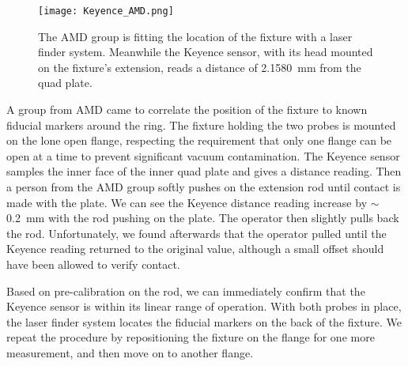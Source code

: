 \begin{figure}[]
	\centering
	\texttt{[image: Keyence\_AMD.png]}
	\caption{The AMD group is fitting the location of the fixture with a laser finder system. Meanwhile the Keyence sensor, with its head mounted on the fixture's extension, reads a distance of \SI{2.1580}{mm} from the quad plate.
	}\label{fig:Keyence_AMD}
\end{figure}


A group from AMD came to correlate the position of the fixture to known fiducial markers around the ring.
The fixture holding the two probes is mounted on the lone open flange, respecting the requirement that only one flange can be open at a time to prevent significant vacuum contamination. 
The Keyence sensor samples the inner face of the inner quad plate and gives a distance reading. 
Then a person from the AMD group softly pushes on the extension rod until contact is made with the plate. 
We can see the Keyence distance reading increase by $\sim$\SI{0.2}{mm} with the rod pushing on the plate. The operator then slightly pulls back the rod. Unfortunately, we found afterwards that the operator pulled until the Keyence reading returned to the original value, although a small offset should have been allowed to verify contact. 

Based on pre-calibration on the rod, we can immediately confirm that the Keyence sensor is within its linear range of operation.
With both probes in place, the laser finder system locates the fiducial markers on the back of the fixture.
We repeat the procedure by repositioning the fixture on the flange for one more measurement, and then move on to another flange.


